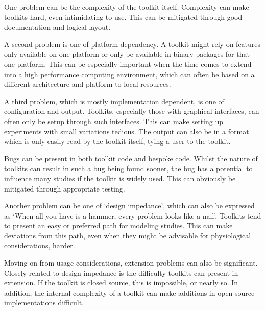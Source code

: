 One problem can be the complexity of the toolkit itself.
Complexity can make toolkits hard, even intimidating to use.
This can be mitigated through good documentation and logical layout.

A second problem is one of platform dependency.
A toolkit might rely on features only available on one platform or only be
available in binary packages for that one platform.
This can be especially important when the time comes to extend into a high
performance computing environment, which can often be based on a different
architecture and platform to local resources.

A third problem, which is mostly implementation dependent, is one of
configuration and output.
Toolkits, especially those with graphical interfaces, can often only be setup
through such interfaces.
This can make setting up experiments with small variations tedious.
The output can also be in a format which is only easily read by the toolkit
itself, tying a user to the toolkit.

Bugs can be present in both toolkit code and bespoke code.
Whilst the nature of toolkits can result in such a bug being found sooner, the
bug has a potential to influence many studies if the toolkit is widely used.
This can obviously be mitigated through appropriate testing.

Another problem can be one of `design impedance', which can also be expressed as
`When all you have is a hammer, every problem looks like a nail'.
Toolkits tend to present an easy or preferred path for modeling studies.
This can make deviations from this path, even when they might be advisable for
physiological considerations, harder.

Moving on from usage considerations, extension problems can also be significant.
Closely related to design impedance is the difficulty toolkits can present in
extension.
If the toolkit is closed source, this is impossible, or nearly so.
In addition, the internal complexity of a toolkit can make additions in open
source implementations difficult.


